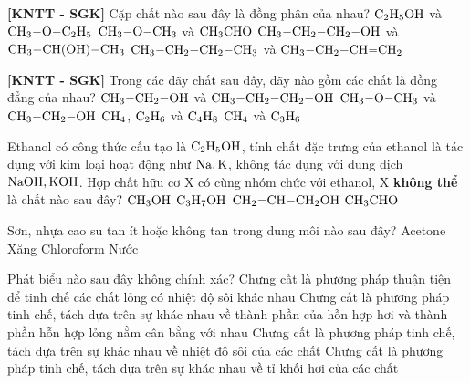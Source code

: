 \documentclass[12pt,a4paper]{article}
\begin{document}
\begin{ex}
\textbf{[KNTT - SGK]} Cặp chất nào sau đây là đồng phân của nhau?
\choice
{$\ce{C2H5OH}$ và $\ce{CH3-O-C2H5}$}
{$\ce{CH3-O-CH3}$ và $\ce{CH3CHO}$}
{\True $\ce{CH3-CH2-CH2-OH}$ và $\ce{CH3-CH(OH)-CH3}$}
{$\ce{CH3-CH2-CH2-CH3}$ và $\ce{CH3-CH2-CH=CH2}$}

\end{ex}

\begin{ex}
\textbf{[KNTT - SGK]} Trong các dãy chất sau đây, dãy nào gồm các chất là đồng đẳng của nhau?
\choice
{\True $\ce{CH3-CH2-OH}$ và $\ce{CH3-CH2-CH2-OH}$}
{$\ce{CH3-O-CH3}$ và $\ce{CH3-CH2-OH}$}
{$\ce{CH4}$, $\ce{C2H6}$ và $\ce{C4H8}$}
{$\ce{CH4}$ và $\ce{C3H6}$}

\end{ex}

\begin{ex}
Ethanol có công thức cấu tạo là $\ce{C2H5OH}$, tính chất đặc trưng của ethanol là tác dụng với kim loại hoạt động như $\ce{Na, K}$, không tác dụng với dung dịch $\ce{NaOH, KOH}$. Hợp chất hữu cơ X có cùng nhóm chức với ethanol, X \textbf{không thể} là chất nào sau đây?
\choice
{$\ce{CH3OH}$}
{$\ce{C3H7OH}$}
{$\ce{CH2=CH-CH2OH}$}
{\True $\ce{CH3CHO}$}

\end{ex}

\begin{ex}
Sơn, nhựa cao su tan ít hoặc không tan trong dung môi nào sau đây?
\choice
{Acetone}
{Xăng}
{Chloroform}
{\True Nước}

\end{ex}

\begin{ex}
Phát biểu nào sau đây không chính xác?
\choice
{Chưng cất là phương pháp thuận tiện để tinh chế các chất lỏng có nhiệt độ sôi khác nhau}
{Chưng cất là phương pháp tinh chế, tách dựa trên sự khác nhau về thành phần của hỗn hợp hơi và thành phần hỗn hợp lỏng nằm cân bằng với nhau}
{Chưng cất là phương pháp tinh chế, tách dựa trên sự khác nhau về nhiệt độ sôi của các chất}
{\True Chưng cất là phương pháp tinh chế, tách dựa trên sự khác nhau về tỉ khối hơi của các chất}

\end{ex}
\end{document}

